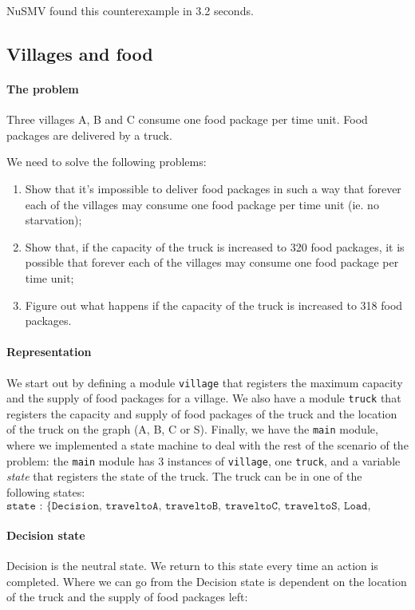 \documentclass[12pt]{article}
\begin{document}
NuSMV found this counterexample in 3.2 seconds.

\clearpage

\subsection*{Villages and food}
\paragraph{The problem}Three villages A, B and C consume one food package per time unit. 
Food packages are delivered by a truck. 

We need to solve the following problems:
\begin{enumerate}
\item Show that it's impossible to deliver food packages in such a way that 
forever each of the villages may consume one food package per time unit 
(ie. no starvation);
\item Show that, 
if the capacity of the truck is increased to 320 food packages, 
it is possible that forever each of the villages 
may consume one food package per time unit;
\item Figure out what happens if the capacity of the truck is increased to 318 food packages.
\end{enumerate}

\paragraph{Representation} We start out by defining a module \texttt{village} that registers the maximum capacity and the supply of food packages for a village.
We also have a module \texttt{truck} that registers 
the capacity and supply of food packages of the truck and 
the location of the truck on the graph (A, B, C or S).
Finally, we have the \texttt{main} module, 
where we implemented a state machine to deal with the 
rest of the scenario of the problem:
the \texttt{main} module has 3 instances of \texttt{village}, 
one \texttt{truck}, 
and a variable \emph{state} that registers the state of the truck. 
The truck can be in one of the following states:
\[\texttt{state : \{Decision, traveltoA, traveltoB, traveltoC, traveltoS, Load, Unload\}}\]

\paragraph{Decision state} Decision is the neutral state. 
We return to this state every time an action is completed. 
Where we can go from the Decision state is dependent on 
the location of the truck and the supply of food packages left:\\
\end{document}
